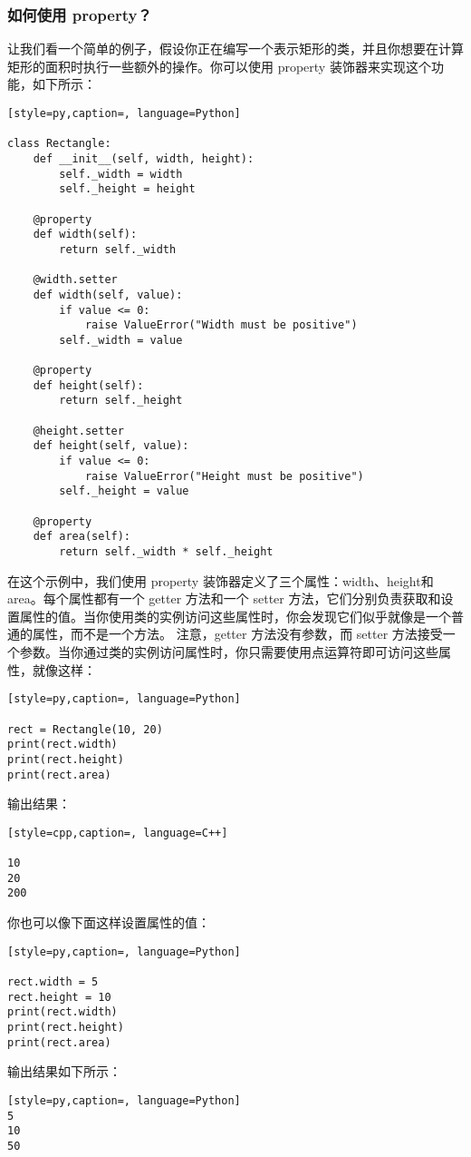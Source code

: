 \subsubsection{如何使用 property？}
让我们看一个简单的例子，假设你正在编写一个表示矩形的类，并且你想要在计算矩形的面积时执行一些额外的操作。你可以使用 property 装饰器来实现这个功能，如下所示：
\begin{lstlisting}[style=py,caption=, language=Python]

class Rectangle:
    def __init__(self, width, height):
        self._width = width
        self._height = height
    
    @property
    def width(self):
        return self._width
    
    @width.setter
    def width(self, value):
        if value <= 0:
            raise ValueError("Width must be positive")
        self._width = value
    
    @property
    def height(self):
        return self._height
    
    @height.setter
    def height(self, value):
        if value <= 0:
            raise ValueError("Height must be positive")
        self._height = value
    
    @property
    def area(self):
        return self._width * self._height
\end{lstlisting}
在这个示例中，我们使用 property 装饰器定义了三个属性：width、height和area。每个属性都有一个 getter 方法和一个 setter 方法，它们分别负责获取和设置属性的值。当你使用类的实例访问这些属性时，你会发现它们似乎就像是一个普通的属性，而不是一个方法。
注意，getter 方法没有参数，而 setter 方法接受一个参数。当你通过类的实例访问属性时，你只需要使用点运算符即可访问这些属性，就像这样：
\begin{lstlisting}[style=py,caption=, language=Python]

rect = Rectangle(10, 20)
print(rect.width)
print(rect.height)
print(rect.area)
\end{lstlisting}
输出结果：
\begin{lstlisting}[style=cpp,caption=, language=C++]

10
20
200
\end{lstlisting}
你也可以像下面这样设置属性的值：
\begin{lstlisting}[style=py,caption=, language=Python]

rect.width = 5
rect.height = 10
print(rect.width)
print(rect.height)
print(rect.area)
\end{lstlisting}
输出结果如下所示：
\begin{lstlisting}[style=py,caption=, language=Python]
5
10
50
\end{lstlisting}
